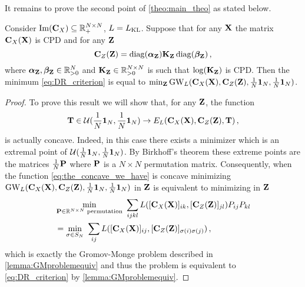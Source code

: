 It remains to prove the second point of \cref{theo:main_theo} as stated below.
\begin{proposition}
	\label{prop:second_point_theorem}
	Consider $\operatorname{Im}({\mathbf{C}}_{X}) \subseteq \mathbb{R}_+^{N \times N}$, $L = L_{\operatorname{KL}}$. Suppose that for any ${\mathbf{X}}$ the matrix ${\mathbf{C}}_{X}({\mathbf{X}})$ is CPD and for any ${\mathbf{Z}}$ 
	\begin{equation}
		{\mathbf{C}}_{Z}({\mathbf{Z}}) = \operatorname{diag}(\boldsymbol\alpha_{\mathbf{Z}}) {\mathbf{K}}_{\mathbf{Z}} \operatorname{diag}(\boldsymbol\beta_{\mathbf{Z}})\,,
	\end{equation}
	where $\boldsymbol\alpha_{\mathbf{Z}}, \boldsymbol\beta_{\mathbf{Z}} \in \mathbb{R}^{N}_{> 0}$ and  ${\mathbf{K}}_{\mathbf{Z}} \in \mathbb{R}^{N \times N}_{> 0}$ is such that $\log({\mathbf{K}}_{\mathbf{Z}})$ is CPD. Then the minimum \cref{eq:DR_criterion} is equal to $\min_{{\mathbf{Z}}} \operatorname{GW}_L({\mathbf{C}}_{X}({\mathbf{X}}), {\mathbf{C}}_{Z}({\mathbf{Z}}), \frac{1}{N}\bm{1}_N, \frac{1}{N}\bm{1}_N)$. 
\end{proposition}
\begin{proof}
	To prove this result we will show that, for any ${\mathbf{Z}}$, the function
	\begin{equation}
		\label{eq:the_concave_we_have}
		{\mathbf{T}} \in {\mathcal{U}}(\frac{1}{N}\bm{1}_N, \frac{1}{N}\bm{1}_N) \to E_{L}({\mathbf{C}}_{X}({\mathbf{X}}), {\mathbf{C}}_{Z}({\mathbf{Z}}), {\mathbf{T}})\,,
	\end{equation}
	is actually concave. Indeed, in this case  there exists a minimizer which is an extremal point of ${\mathcal{U}}(\frac{1}{N}\bm{1}_N, \frac{1}{N}\bm{1}_N)$. By Birkhoff’s theorem \citep{birkhoff1946tres} these extreme points are the matrices $\frac{1}{N} {\mathbf{P}}$ where ${\mathbf{P}}$ is a $N \times N$ permutation matrix. Consequently, when the function \cref{eq:the_concave_we_have} is concave minimizing $\operatorname{GW}_L({\mathbf{C}}_{X}({\mathbf{X}}), {\mathbf{C}}_{Z}({\mathbf{Z}}), \frac{1}{N}\bm{1}_N, \frac{1}{N}\bm{1}_N)$ in ${\mathbf{Z}}$ is equivalent to minimizing in ${\mathbf{Z}}$
	\begin{align}
		&\min_{\mP \in \R^{N \times N} \text{ permutation}} \ \sum_{ijkl} L([\simiX(\mX)]_{ik}, [\simi(\mZ)]_{jl}) P_{ij} P_{kl} \\
        &= \min_{\sigma \in S_N} \ \sum_{ij} L([\simiX(\mX)]_{ij}, [\simi(\mZ)]_{\sigma(i)\sigma(j)})\,,
	\end{align}
	which is exactly the Gromov-Monge problem described in \cref{lemma:GMproblemequiv} and thus the problem is equivalent to \cref{eq:DR_criterion} by \cref{lemma:GMproblemequiv}.
	

\end{proof}
